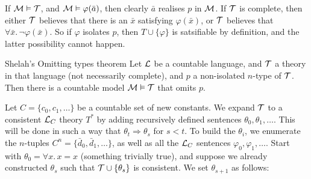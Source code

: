 \documentclass{article}
\numberwithin{thm}{subsection}
\begin{document}
\proof If $\mathcal{M} \vDash \mathcal{T}$, and $\mathcal{M} \vDash \varphi(\bar a)$, then clearly $\bar a$ realises $p$ in $\mathcal{M}$. If $\mathcal{T}$ is complete, then either $\mathcal{T}$ believes that there is an $\bar x$ satisfying $\varphi(\bar x)$, or $\mathcal{T}$ believes that $\forall \bar x. \, \neg \varphi(\bar x)$. So if $\varphi$ isolates $p$, then $T \cup \{ \varphi\}$ is satsifiable by definition, and the latter possibility cannot happen.
\begin{fancythm}{Shelah's Omitting types theorem}
    Let $\mathcal{L}$ be a countable language, and $\mathcal{T}$ a theory in that language (not necessarily complete), and $p$ a non-isolated $n$-type of $\mathcal{T}$. Then there is a countable model $\mathcal{M} \vDash \mathcal{T}$ that omits $p$.
\end{fancythm}
\proof Let $C = \{ c_0, c_1, \dots \}$ be a countable set of new constants. We expand $\mathcal{T}$ to a consistent $\mathcal{L}_C$ theory $T^*$ by adding recursively defined sentences $\theta_0, \theta_1, \dots$. \gap This will be done in such a way that $\theta_t \Rightarrow \theta_s$ for $s<t$. To build the $\theta_i$, we enumerate the $n$-tuples $C^n = \{ \bar d_0, \bar d_1, \dots \}$, as well as all the $\mathcal{L}_C$ sentences $\varphi_0, \varphi_1, \dots$. Start with $\theta_0 = \forall x. \, x=x$ (something trivially true), and suppose we already constructed $\theta_s$ such that $\mathcal{T} \cup \{\theta_s\}$ is consistent. We set $\theta_{s+1}$ as follows: \
\end{document}
